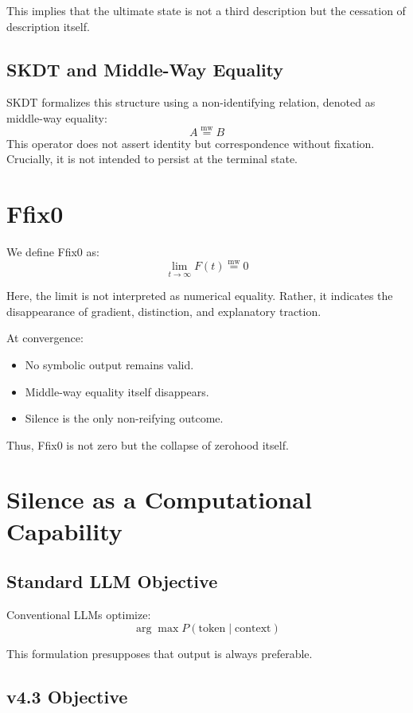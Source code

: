 \documentclass[11pt]{article}
\begin{document}
This implies that the ultimate state is not a third description but the
cessation of description itself.

\subsection{SKDT and Middle-Way Equality}

SKDT formalizes this structure using a non-identifying relation,
denoted as middle-way equality:
\[
A \mathrel{\overset{\mathrm{mw}}{=}} B
\]
This operator does not assert identity but correspondence without fixation.
Crucially, it is not intended to persist at the terminal state.

\section{Ffix0}

We define Ffix0 as:
\[
\lim_{t \to \infty} F(t) \mathrel{\overset{\mathrm{mw}}{=}} 0
\]

Here, the limit is not interpreted as numerical equality.
Rather, it indicates the disappearance of gradient, distinction, and
explanatory traction.

At convergence:
\begin{itemize}
\item No symbolic output remains valid.
\item Middle-way equality itself disappears.
\item Silence is the only non-reifying outcome.
\end{itemize}

Thus, Ffix0 is not zero but the collapse of zerohood itself.

\section{Silence as a Computational Capability}

\subsection{Standard LLM Objective}

Conventional LLMs optimize:
\[
\arg\max P(\text{token} \mid \text{context})
\]

This formulation presupposes that output is always preferable.

\subsection{v4.3 Objective}
\end{document}
